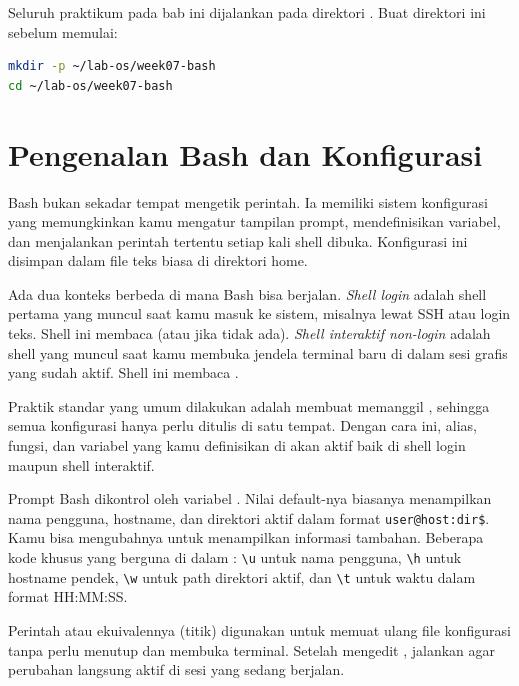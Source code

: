 \begin{notebox}
Seluruh praktikum pada bab ini dijalankan pada direktori
.
Buat direktori ini sebelum memulai:
\begin{lstlisting}[language=bash]
mkdir -p ~/lab-os/week07-bash
cd ~/lab-os/week07-bash
\end{lstlisting}
\end{notebox}

\section{Pengenalan Bash dan Konfigurasi}
\label{sec:pengenalan-bash-konfigurasi}

Bash bukan sekadar tempat mengetik perintah. Ia memiliki sistem
konfigurasi yang memungkinkan kamu mengatur tampilan prompt, mendefinisikan
variabel, dan menjalankan perintah tertentu setiap kali shell dibuka.
Konfigurasi ini disimpan dalam file teks biasa di direktori home.

Ada dua konteks berbeda di mana Bash bisa berjalan. \textit{Shell login}
adalah shell pertama yang muncul saat kamu masuk ke sistem, misalnya
lewat SSH atau login teks. Shell ini membaca  (atau
 jika  tidak ada). \textit{Shell
interaktif non-login} adalah shell yang muncul saat kamu membuka jendela
terminal baru di dalam sesi grafis yang sudah aktif. Shell ini membaca
.

Praktik standar yang umum dilakukan adalah membuat 
memanggil , sehingga semua konfigurasi hanya perlu ditulis
di satu tempat. Dengan cara ini, alias, fungsi, dan variabel yang kamu
definisikan di  akan aktif baik di shell login maupun
shell interaktif.

Prompt Bash dikontrol oleh variabel . Nilai default-nya biasanya
menampilkan nama pengguna, hostname, dan direktori aktif dalam format
\texttt{user@host:dir\$}. Kamu bisa mengubahnya untuk menampilkan informasi
tambahan. Beberapa kode khusus yang berguna di dalam :
\texttt{\textbackslash u} untuk nama pengguna, \texttt{\textbackslash h}
untuk hostname pendek, \texttt{\textbackslash w} untuk path direktori aktif,
dan \texttt{\textbackslash t} untuk waktu dalam format HH:MM:SS.

Perintah  atau ekuivalennya  (titik) digunakan untuk
memuat ulang file konfigurasi tanpa perlu menutup dan membuka terminal.
Setelah mengedit , jalankan  agar
perubahan langsung aktif di sesi yang sedang berjalan.

